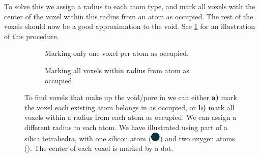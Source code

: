 To solve this we assign a radius to each atom type, and mark all voxels with the center of the voxel within this radius from an atom as occupied. The rest of the voxels should now be a good approximation to the void. See \cref{fig:inject_empty_voxel} for an illustration of this procedure. 
%
\begin{figure}[htpb]%
    \centering%
    \begin{subfigure}[b]{0.45\textwidth}%
        \caption{Marking only one voxel per atom as occupied.}%
    \end{subfigure}%
    \hspace{0.05\textwidth}%
    \begin{subfigure}[b]{0.45\textwidth}%
        \caption{Marking all voxels within radius from atom as occupied.}%
    \end{subfigure}%
    \caption[
        To find voxels that make up the void/pore in we can either \textbf{a)} mark the voxel each existing atom belongs in as occupied, or \textbf{b)} mark all voxels within a radius from each atom as occupied. We can assign a different radius to each atom. We have illustrated using part of a silica tetrahedra, with one silicon atom (the large blue dot) and two oxygen atoms (the smaller red dot). The center of each voxel is marked by a dot 
    ]{%
        To find voxels that make up the void/pore in we can either \textbf{a)} mark the voxel each existing atom belongs in as occupied, or \textbf{b)} mark all voxels within a radius from each atom as occupied. We can assign a different radius to each atom. We have illustrated using part of a silica tetrahedra, with one silicon atom (\includegraphics[scale=0.8]{./images/inject_water/silicon.pdf}) and two oxygen atoms (). The center of each voxel is marked by a dot. %
    }%
    \label{fig:inject_empty_voxel}%
\end{figure}%

